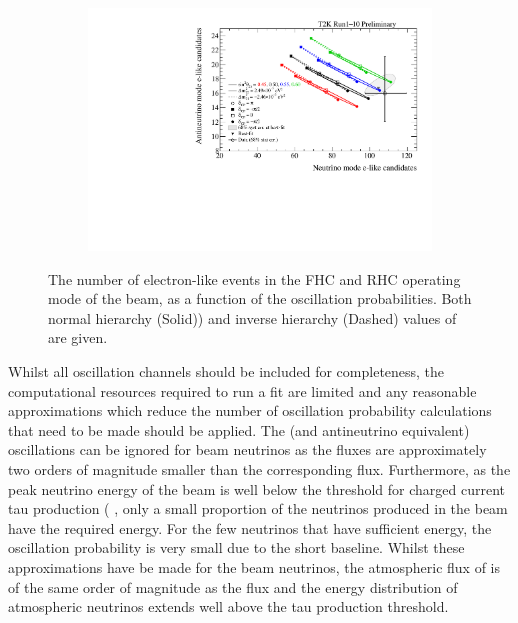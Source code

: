 \begin{figure}[h]
  \begin{subfigure}[t]{0.65\textwidth}
    \includegraphics[width=\textwidth, trim={0mm 0mm 0mm 0mm}, clip,page=1]{Figures/Oscillation/BiProbabilityPlot.pdf}
  \end{subfigure}
  \caption{The number of electron-like events in the FHC and RHC operating mode of the beam, as a function of the oscillation probabilities. Both normal hierarchy (Solid)) and inverse hierarchy (Dashed) values of \delmsqatm are given.}
  \label{fig:Oscillation_SK_BiProbabilityPlot}
\end{figure}

Whilst all oscillation channels should be included for completeness, the computational resources required to run a fit are limited and any reasonable approximations which reduce the number of oscillation probability calculations that need to be made should be applied. The  (and antineutrino equivalent) oscillations can be ignored for beam neutrinos as the  fluxes are approximately two orders of magnitude smaller than the corresponding \quickmath{\nu_{\mu}/\bar{\nu}_{\mu}} flux. Furthermore, as the peak neutrino energy of the beam is well below the threshold for charged current tau production ( \cite{Li_2018}, only a small proportion of the neutrinos produced in the beam have the required energy. For the few neutrinos that have sufficient energy, the oscillation probability is very small due to the short baseline. Whilst these approximations have be made for the beam neutrinos, the atmospheric flux of  is of the same order of magnitude as the \quickmath{\nu_{\mu}} flux and the energy distribution of atmospheric neutrinos extends well above the tau production threshold.

